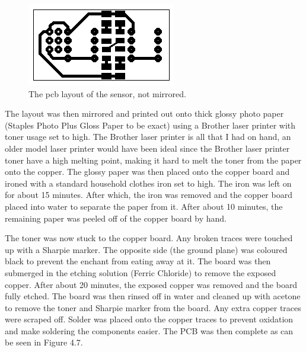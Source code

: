 \begin{figure}[htp]
\centering
\includegraphics{sensorpcb.png}
\caption[Sensor pcb layout]{The pcb layout of the  sensor, not mirrored.}
\end{figure}

The layout was then mirrored and printed out onto thick glossy photo paper (Staples Photo Plus Gloss Paper to be exact) using a Brother laser printer with toner usage set to high. The Brother laser printer is all that I had on hand, an older model laser printer would have been ideal since the Brother laser printer toner have a high melting point, making it hard to melt the toner from the paper onto the copper. The glossy paper was then placed onto the copper board and ironed with a standard household clothes iron set to high. The iron was left on for about 15 minutes. After which, the iron was removed and the copper board placed into water to separate the paper from it. After about 10 minutes, the remaining paper was peeled off of the copper board by hand. 

The toner was now stuck to the copper board. Any broken traces were touched up with a Sharpie marker. The opposite side (the ground plane) was coloured black to prevent the enchant from eating away at it. The board was then submerged in the etching solution (Ferric Chloride) to remove the exposed copper. After about 20 minutes, the exposed copper was removed and the board fully etched. The board was then rinsed off in water and cleaned up with acetone to remove the toner and Sharpie marker from the board. Any extra copper traces were scraped off. Solder was placed onto the copper traces to prevent oxidation and make soldering the components easier. The PCB was then complete as can be seen in Figure 4.7.

